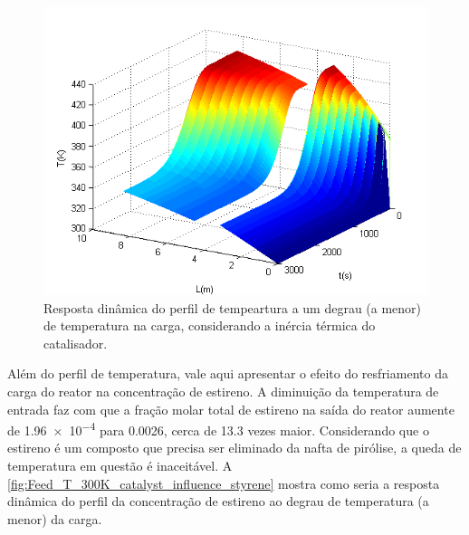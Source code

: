 \begin{figure}[htb]
\centering
\includegraphics[scale=0.8]{images/Chap4/Feed_T_300K_catalyst_influence.png}
\caption{Resposta dinâmica do perfil de tempeartura a um degrau (a menor) de
temperatura na carga, considerando a inércia térmica do catalisador.}
\label{fig:Feed_T_300K_catalyst_influence}
\end{figure}

% 

Além do perfil de temperatura, vale aqui apresentar o efeito do resfriamento da
carga do reator na concentração de estireno. A diminuição da temperatura de
entrada faz com que a fração molar total de estireno na saída do reator aumente
de \num{1,96e-4} para \num{0,0026}, cerca de \num{13,3} vezes maior.
Considerando que o estireno é um composto que precisa ser eliminado da nafta de
pirólise, a queda de temperatura em questão é inaceitável. A
\autoref{fig:Feed_T_300K_catalyst_influence_styrene} mostra como seria a
resposta dinâmica do perfil da concentração de estireno ao degrau de temperatura
(a menor) da carga.


